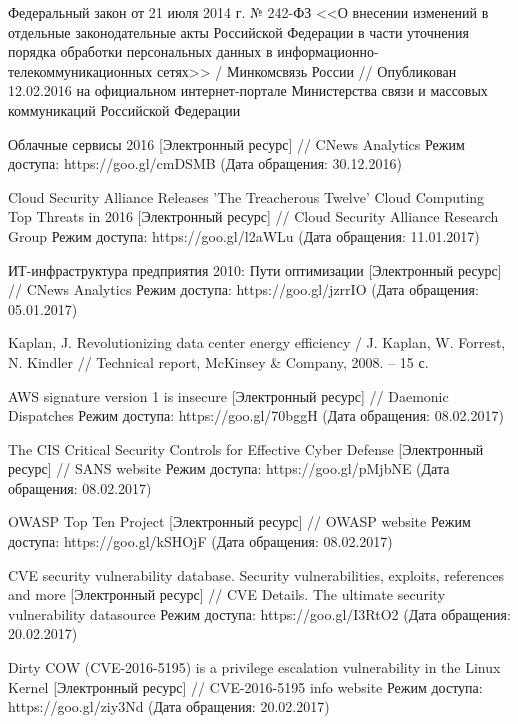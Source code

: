 \begin{thebibliography}{00}
    Федеральный закон от 21 июля 2014 г. № 242-ФЗ <<О внесении изменений в отдельные законодательные акты Российской Федерации в части уточнения порядка обработки персональных данных в информационно-телекоммуникационных сетях>> /
    Минкомсвязь России //
    Опубликован 12.02.2016 на официальном интернет-портале Министерства связи и массовых коммуникаций Российской Федерации

    Облачные сервисы 2016
    [Электронный ресурс] //
    CNews Analytics
    Режим доступа: https://goo.gl/cmDSMB
    (Дата обращения: 30.12.2016)

    Cloud Security Alliance Releases 'The Treacherous Twelve' Cloud Computing Top Threats in 2016
    [Электронный ресурс] //
    Cloud Security Alliance Research Group
    Режим доступа: https://goo.gl/l2aWLu
    (Дата обращения: 11.01.2017)

    ИТ-инфраструктура предприятия 2010: Пути оптимизации
    [Электронный ресурс] //
    CNews Analytics
    Режим доступа: https://goo.gl/jzrrIO
    (Дата обращения: 05.01.2017)

    Kaplan, J.
    Revolutionizing data center energy efficiency /
    J. Kaplan, W. Forrest, N. Kindler //
    Technical report, McKinsey \& Company, 2008. -- 15 с.

    AWS signature version 1 is insecure
    [Электронный ресурс] //
    Daemonic Dispatches
    Режим доступа: https://goo.gl/70bggH
    (Дата обращения: 08.02.2017)

    The CIS Critical Security Controls for Effective Cyber Defense
    [Электронный ресурс] //
    SANS website
    Режим доступа: https://goo.gl/pMjbNE
    (Дата обращения: 08.02.2017)

    OWASP Top Ten Project
    [Электронный ресурс] //
    OWASP website
    Режим доступа: https://goo.gl/kSHOjF
    (Дата обращения: 08.02.2017)

    CVE security vulnerability database. Security vulnerabilities, exploits, references and more
    [Электронный ресурс] //
    CVE Details. The ultimate security vulnerability datasource
    Режим доступа: https://goo.gl/I3RtO2
    (Дата обращения: 20.02.2017)

    Dirty COW (CVE-2016-5195) is a privilege escalation vulnerability in the Linux Kernel
    [Электронный ресурс] //
    CVE-2016-5195 info website
    Режим доступа: https://goo.gl/ziy3Nd
    (Дата обращения: 20.02.2017)


\end{thebibliography}
